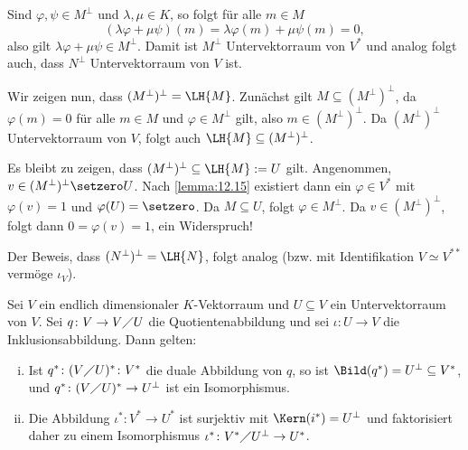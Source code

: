 \begin{beweis}
	Sind $\varphi, \psi \in M^\perp$ und $\lambda, \mu \in K$, so folgt für alle $m \in M$
	\[
	(\lambda \varphi + \mu \psi)(m) = \lambda \varphi(m) + \mu \psi(m) = 0,
	\]
	also gilt $\lambda \varphi + \mu \psi \in M^\perp$.
	Damit ist $M^\perp$ Untervektorraum von $V^*$ und analog folgt auch, dass $N^\perp$ Untervektorraum von $V$ ist.
	
	Wir zeigen nun, dass $(M^\perp)^\perp = \LH\{M\}$.
	Zunächst gilt $M \subseteq (M^\perp)^\perp$, da $\varphi(m) = 0$ für alle $m \in M$ und $\varphi \in M^\perp$ gilt, also $m \in (M^\perp)^\perp$.
	Da $(M^\perp)^\perp$ Untervektorraum von $V$, folgt auch $\LH\{M\} \subseteq (M^\perp)^\perp$.
	
	Es bleibt zu zeigen, dass $(M^\perp)^\perp \subseteq \LH\{M\} := U$ gilt.
	Angenommen, $v \in (M^\perp)^\perp \setzero U$.
	Nach \autoref{lemma:12.15} existiert dann ein $\varphi \in V^*$ mit $\varphi(v) = 1$ und $\varphi(U)=\setzero$.
	Da $M \subseteq U$, folgt $\varphi \in M^\perp$.
	Da $v \in (M^\perp)^\perp$, folgt dann $0 = \varphi(v) = 1$, ein Widerspruch!
	
	Der Beweis, dass $(N^\perp)^\perp = \LH \{N\}$, folgt analog (bzw. mit Identifikation $V \simeq V^{**}$ vermöge $\iota_V$). 
\end{beweis}

\begin{satz}
	\label{satz:12.16}
	Sei $V$ ein endlich dimensionaler $K$-Vektorraum und $U \subseteq V$ ein Untervektorraum von $V$.
	Sei $q \colon V \rightarrow V \diagup U$ die Quotientenabbildung und sei $\iota \colon U \rightarrow V$ die Inklusionsabbildung.
	Dann gelten:
	\begin{enumerate}[(i)]
		\item Ist $q^*\colon (V \diagup U)^* \colon V^*$ die duale Abbildung von $q$, so ist $\Bild(q^*) = U^\perp \subseteq V^*$, und $q^*\colon (V \diagup U)^* \rightarrow U^\perp$ ist ein Isomorphismus.
		\item Die Abbildung $\iota^*\colon V^* \rightarrow U^*$ ist surjektiv mit $\Kern(i^*) = U^\perp$ und faktorisiert daher zu einem Isomorphismus $\iota^* \colon V^* \diagup U^\perp \rightarrow U^*$.
	\end{enumerate}
\end{satz}


